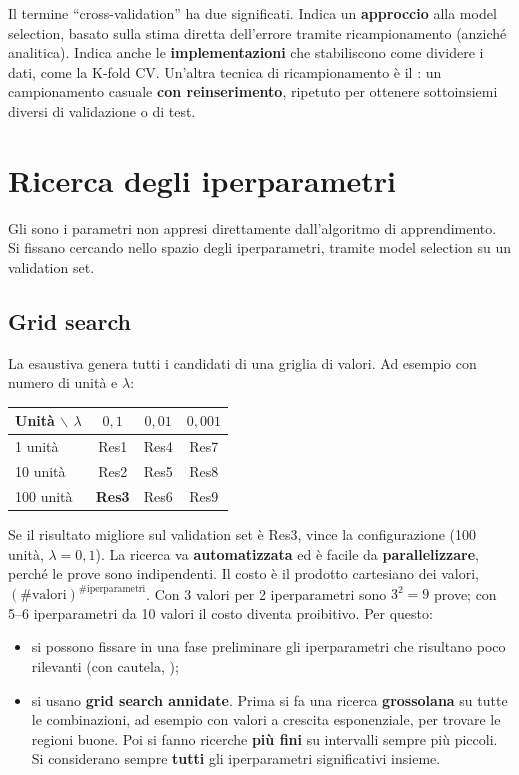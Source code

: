 Il termine ``cross-validation'' ha due significati. Indica un \textbf{approccio} alla model selection, basato sulla
stima diretta dell'errore tramite ricampionamento (anziché analitica). Indica anche le \textbf{implementazioni}
che stabiliscono come dividere i dati, come la K-fold CV. Un'altra tecnica di ricampionamento è il
: un campionamento casuale \textbf{con reinserimento}, ripetuto per ottenere sottoinsiemi
diversi di validazione o di test.

\section{Ricerca degli iperparametri}
\label{sec:grid-search}

Gli  sono i parametri non appresi direttamente dall'algoritmo di apprendimento. Si fissano
cercando nello spazio degli iperparametri, tramite model selection su un validation set.

\subsection{Grid search}

La  esaustiva genera tutti i candidati di una griglia di valori. Ad esempio con numero di
unità e $\lambda$:

\begin{center}\small
\begin{tabular}{l|ccc}
Unità $\backslash$ $\lambda$ & $0{,}1$ & $0{,}01$ & $0{,}001$\\
\hline
1 unità & Res1 & Res4 & Res7\\
10 unità & Res2 & Res5 & Res8\\
100 unità & \textbf{Res3} & Res6 & Res9\\
\end{tabular}
\end{center}
Se il risultato migliore sul validation set è Res3, vince la configurazione (100 unità, $\lambda=0{,}1$). La
ricerca va \textbf{automatizzata} ed è facile da \textbf{parallelizzare}, perché le prove sono indipendenti. Il
costo è il prodotto cartesiano dei valori, $(\#\text{valori})^{\#\text{iperparametri}}$. Con 3 valori per 2
iperparametri sono $3^2=9$ prove; con 5--6 iperparametri da 10 valori il costo diventa proibitivo. Per questo:
\begin{itemize}
  \item si possono fissare in una fase preliminare gli iperparametri che risultano poco rilevanti (con cautela,
        );
  \item si usano \textbf{grid search annidate}. Prima si fa una ricerca \textbf{grossolana} su tutte le
        combinazioni, ad esempio con valori a crescita esponenziale, per trovare le regioni buone. Poi si fanno
        ricerche \textbf{più fini} su intervalli sempre più piccoli. Si considerano sempre \textbf{tutti} gli
        iperparametri significativi insieme.
\end{itemize}

